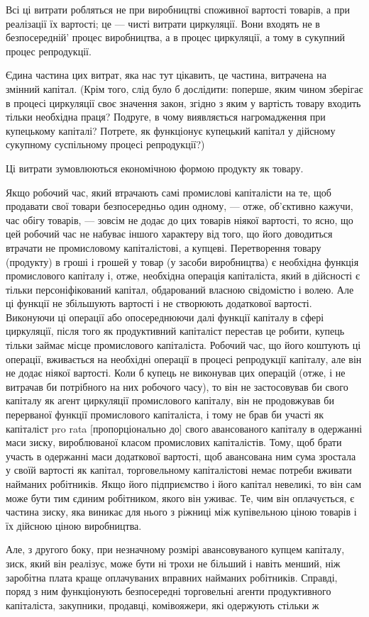 Всі ці витрати робляться не при виробництві споживної вартості
товарів, а при реалізації їх вартості; це — чисті витрати
циркуляції. Вони входять не в безпосередній' процес виробництва,
а в процес циркуляції, а тому в сукупний процес репродукції.

Єдина частина цих витрат, яка нас тут цікавить, це частина,
витрачена на змінний капітал. (Крім того, слід було б дослідити:
поперше, яким чином зберігає в процесі циркуляції своє
значення закон, згідно з яким у вартість товару входить тільки
необхідна праця? Подруге, в чому виявляється нагромадження
при купецькому капіталі? Потрете, як функціонує купецький капітал
у дійсному сукупному суспільному процесі репродукції?)

Ці витрати зумовлюються економічною формою продукту як
товару.

Якщо робочий час, який втрачають самі промислові капіталісти
на те, щоб продавати свої товари безпосередньо один
одному, — отже, об’єктивно кажучи, час обігу товарів, — зовсім
не додає до цих товарів ніякої вартості, то ясно, що цей робочий
час не набуває іншого характеру від того, що його доводиться
втрачати не промисловому капіталістові, а купцеві. Перетворення
товару (продукту) в гроші і грошей у товар (у засоби
виробництва) є необхідна функція промислового капіталу і, отже,
необхідна операція капіталіста, який в дійсності є тільки персоніфікований
капітал, обдарований власною свідомістю і волею.
Але ці функції не збільшують вартості і не створюють додаткової
вартості. Виконуючи ці операції або опосереднюючи далі
функції капіталу в сфері циркуляції, після того як продуктивний
капіталіст перестав це робити, купець тільки займає місце
промислового капіталіста. Робочий час, що його коштують ці
операції, вживається на необхідні операції в процесі репродукції
капіталу, але він не додає ніякої вартості. Коли б купець
не виконував цих операцій (отже, і не витрачав би потрібного на
них робочого часу), то він не застосовував би свого капіталу
як агент циркуляції промислового капіталу, він не продовжував би
перерваної функції промислового капіталіста, і тому не брав би
участі як капіталіст pro rata [пропорціонально до] свого авансованого
капіталу в одержанні маси зиску, вироблюваної класом
промислових капіталістів. Тому, щоб брати участь в одержанні
маси додаткової вартості, щоб авансована ним сума зростала
у своїй вартості як капітал, торговельному капіталістові немає
потреби вживати найманих робітників. Якщо його підприємство
і його капітал невеликі, то він сам може бути тим єдиним робітником,
якого він уживає. Те, чим він оплачується, є частина
зиску, яка виникає для нього з ріжниці між купівельною ціною
товарів і їх дійсною ціною виробництва.

Але, з другого боку, при незначному розмірі авансовуваного
купцем капіталу, зиск, який він реалізує, може бути ні трохи
не більший і навіть менший, ніж заробітна плата краще оплачуваних
вправних найманих робітників. Справді, поряд з ним функціонують
безпосередні торговельні агенти продуктивного капіталіста,
закупники, продавці, комівояжери, які одержують стільки ж
\parbreak{}  %
